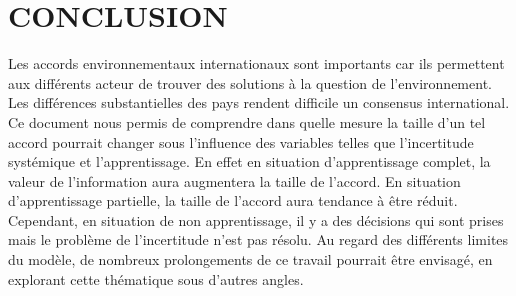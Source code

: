 \documentclass[12pt]{article}
\begin{document}
\section{CONCLUSION}
\par Les accords environnementaux internationaux sont importants car ils permettent aux différents acteur de trouver des solutions à la question de l'environnement. Les différences substantielles des pays rendent difficile un consensus international. Ce document nous permis de comprendre dans quelle mesure la taille d'un tel accord pourrait changer sous l'influence des variables telles que l'incertitude systémique et l'apprentissage. En effet en situation d'apprentissage complet, la valeur de l'information aura augmentera la taille de l'accord. En situation d'apprentissage partielle, la taille de l'accord aura tendance à être réduit. Cependant, en situation de non apprentissage, il y a des décisions qui sont prises mais le problème de l'incertitude n'est pas résolu. Au regard des différents limites du modèle, de nombreux prolongements de ce travail pourrait être envisagé, en explorant cette thématique sous d'autres angles.
\end{document}

